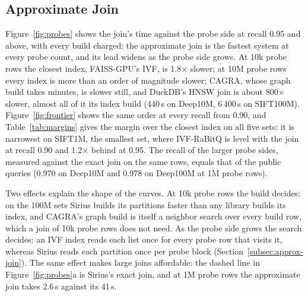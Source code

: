 \subsection{Approximate Join}\label{subsec:eval-approx}




Figure~\ref{fig:probes} shows the join's time against the probe side at recall 0.95 and above, with every build charged: the approximate join is the fastest system at every probe count, and its lead widens as the probe side grows.
At 10k probe rows the closest index, FAISS-GPU's IVF, is 1.8$\times$ slower; at 10M probe rows every index is more than an order of magnitude slower; CAGRA, whose graph build takes minutes, is slower still, and DuckDB's HNSW join is about 800$\times$ slower, almost all of it its index build (440\,s on Deep10M, 6\,400\,s on SIFT100M).
Figure~\ref{fig:frontier} shows the same order at every recall from 0.90, and Table~\ref{tab:margins} gives the margin over the closest index on all five sets: it is narrowest on SIFT1M, the smallest set, where IVF-RaBitQ is level with the join at recall 0.90 and 1.2$\times$ behind at 0.95.
The recall of the larger probe sides, measured against the exact join on the same rows, equals that of the public queries (0.970 on Deep10M and 0.978 on Deep100M at 1M probe rows).


Two effects explain the shape of the curves.
At 10k probe rows the build decides: on the 100M sets Sirius builds its partitions faster than any library builds its index, and CAGRA's graph build is itself a neighbor search over every build row, which a join of 10k probe rows does not need.
As the probe side grows the search decides: an IVF index reads each list once for every probe row that visits it, whereas Sirius reads each partition once per probe block (Section~\ref{subsec:approx-join}).
The same effect makes large joins affordable: the dashed line in Figure~\ref{fig:probes}a is Sirius's exact join, and at 1M probe rows the approximate join takes 2.6\,s against its 41\,s.


